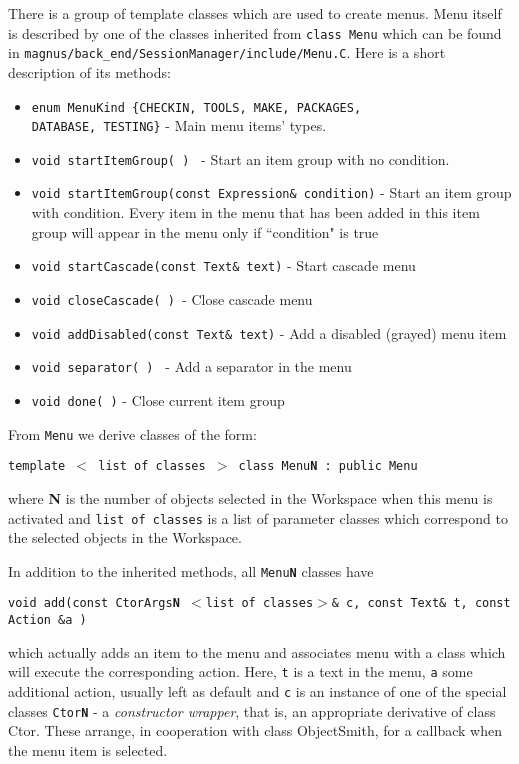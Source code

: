 \documentclass[12pt]{article}
\begin{document}
There is a group of template classes which are used to create menus.
Menu itself is described by one of the classes inherited from {\tt class Menu}
which can be
found in
{\tt magnus/back\_end/SessionManager/include/Menu.C}.
Here is a short description of its methods:
\begin{itemize}
\item {\tt  enum MenuKind \{CHECKIN, TOOLS, MAKE, PACKAGES,\\ 
DATABASE, TESTING\}} - Main menu items' types.

\item {\tt   void startItemGroup( ) } - Start an item group with no condition.


\item {\tt  void startItemGroup(const Expression\& condition)} - Start an item 
group with condition. Every item in the menu that has been added in this item group 
will appear in the menu only if ``condition" is true


\item {\tt  void startCascade(const Text\& text)} - Start cascade menu

\item {\tt   void closeCascade( ) }- Close cascade menu

\item {\tt  void addDisabled(const Text\& text)} - Add a disabled
(grayed) menu
item

\item {\tt   void separator( ) } -  Add a separator in the menu

\item {\tt   void done( )} - Close current item group
\end{itemize}

  From  {\tt Menu} we derive classes of the form:
\begin{center}
{\tt template $<$ list of classes $>$ class Menu\textbf{N} : public Menu}
\end{center}
where {\bf N} is the number of objects selected in the Workspace when this
menu is activated and  {\tt list of classes} is a list of parameter classes
which correspond to the selected objects in the Workspace.

In addition to the inherited methods, all {\tt Menu\textbf{N}} classes
have
\begin{center}
{\tt void add(const CtorArgs\textbf{N} $<$list of classes$>$\& c, const Text\&
t, const Action \&a ) }
\end{center}
which actually adds an item to the menu and associates menu with a class
which will execute the corresponding action. Here, {\tt t} is a text 
in the menu,
{\tt a} some additional action, usually left as default and {\tt c} 
is an instance of
one of the  special classes {\tt Ctor\textbf{N}} - a
{\em constructor wrapper}, that is, an appropriate derivative of class Ctor.
These arrange, in cooperation with class ObjectSmith, for a callback
when the menu item is selected.
\end{document}
